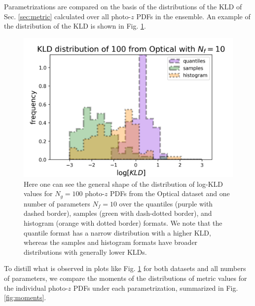 \documentclass[\docopts]{\docclass}
\newcommand{\pz}{photo-$z$ PDF}
\begin{document}
Parametrizations are compared on the basis of the distributions of the KLD of 
Sec. \ref{sec:metric} calculated over all \pz s in the ensemble.  An example of 
the distribution of the KLD is shown in Fig. \ref{fig:individual}.

\begin{figure}
  \includegraphics[width=0.9\columnwidth]{figures/lsst_individual.png}
  \caption{Here one can see the general shape of the distribution of log-KLD 
values for $N_{g}=100$ \pz s from the Optical dataset and one number of 
parameters $N_{f}=10$ over the quantiles (purple with dashed border), samples 
(green with dash-dotted border), and histogram (orange with dotted border) 
formats.  We note that the quantile format has a narrow distribution with a 
higher KLD, whereas the samples and histogram formats have broader 
distributions with generally lower KLDs.
  \label{fig:individual}}
\end{figure}

To distill what is observed in plots like Fig. \ref{fig:individual} for both 
datasets and all numbers of parameters, we compare the moments of the 
distributions of metric values for the individual \pz s under each 
parametrization, summarized in Fig. \ref{fig:moments}.
\end{document}
